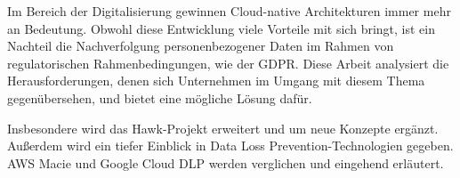 
\begin{zusammenfassung}        %
Im Bereich der Digitalisierung gewinnen Cloud-native Architekturen immer mehr an Bedeutung. Obwohl diese Entwicklung viele Vorteile mit sich bringt, ist ein Nachteil die Nachverfolgung personenbezogener Daten im Rahmen von regulatorischen Rahmenbedingungen, wie der GDPR.
Diese Arbeit analysiert die Herausforderungen, denen sich Unternehmen im Umgang mit diesem Thema gegenübersehen, und bietet eine mögliche Lösung dafür.


Insbesondere wird das Hawk-Projekt erweitert und um neue Konzepte ergänzt. Außerdem wird ein tiefer Einblick in Data Loss Prevention-Technologien gegeben. AWS Macie und Google Cloud DLP werden verglichen und eingehend erläutert.
\end{zusammenfassung}
\ifCLASSINFOlangDE
{}
\else
{}
\fi
